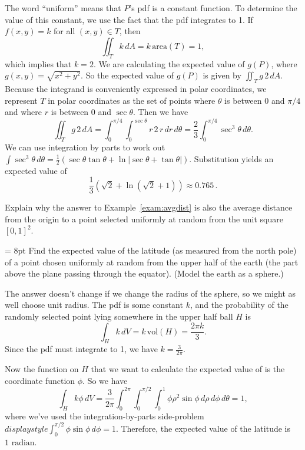 \documentclass[indent]{watsonbook}
\begin{document}
\begin{solution}
  The word ``uniform'' means that $P$'s pdf is a constant function. To
  determine the value of this constant, we use the fact that the pdf
  integrates to 1. If $f(x,y) = k$ for all $(x,y) \in T$, then
  \[
    \iint_T k \, {d} A = k\, \mathrm{area}(T) = 1,
  \]
  which implies that $k=2$. We are calculating the expected
  value of $g(P)$, where $g(x,y) = \sqrt{x^2 + y^2}$. So the expected
  value of $g(P)$ is given by $\iint_T g \, 2\,{d} A$. Because the
  integrand is conveniently expressed in polar coordinates, we
  represent $T$ in polar coordinates as the set of points where
  $\theta$ is between $0$ and $\pi/4$ and where $r$ is between 0
  and $\sec \theta$. Then we have
  \[
    \iint_T g \, 2\, {d} A = \int_{0}^{\pi/4} \int_0^{\sec \theta} r
    \, 2\, r \, {d} r\, {d}\theta = \frac{2}{3} \int_{0}^{\pi/4} \sec^3
    \theta \, {d}\theta.
  \]
  We can use integration by parts to work out
  $\int \sec^3 \theta \, {d} \theta = \frac{1}{2}\left(\sec \theta \tan
    \theta + \ln|\sec\theta + \tan \theta|\right)$.
  Substitution yields an expected value of
  \[
    \boxed{\frac{1}{3}\left(\sqrt{2} +
        \ln\left({\sqrt{2}+1}\right)\right) \approx
      0.765}\,.
  \]
\end{solution}

\begin{exercise}{}{}
  Explain why the answer to Example~\ref{exam:avgdist} is also the
  average distance from the origin to a point selected uniformly at
  random from the unit square $[0,1]^2$.
\end{exercise}

\begin{example}{}{} \parskip = 8pt Find the expected value of the
  latitude (as measured from the north pole) of a point chosen
  uniformly at random from the upper half of the earth (the part above
  the plane passing through the equator). (Model the earth as a
  sphere.)
\end{example}

\begin{solution}
  The answer doesn't change if we change the radius of the sphere, so
  we might as well choose unit radius. The pdf is some constant $k$,
  and the probability of the randomly selected point lying somewhere
  in the upper half ball $H$ is
  \[
    \int_H k \, {d} V = k\, \mathrm{vol}(H) = \frac{2\pi k}{3}.
  \]
  Since the pdf must integrate to 1, we have $k =
  \tfrac{3}{2\pi}$.

  Now the function on $H$ that we want to calculate the expected value
  of is the coordinate function $\phi$. So we have
  \[
    \int_H k\phi \, {d} V = \frac{3}{2\pi} \int_0^{2\pi} \int
    _0^{\pi/2}\int_{0}^{1} \phi \rho^2 \sin \phi \, {d} \rho \, {d} \phi
    \, {d} \theta = 1,
  \]
  where we've used the integration-by-parts side-problem
  ${d}isplaystyle{\int_0^{\pi/2} \phi \sin \phi \, {d} \phi =
    1}$. Therefore, the expected value of the latitude is
  $\boxed{1 \text{ radian}}$.
\end{solution}
\end{document}
